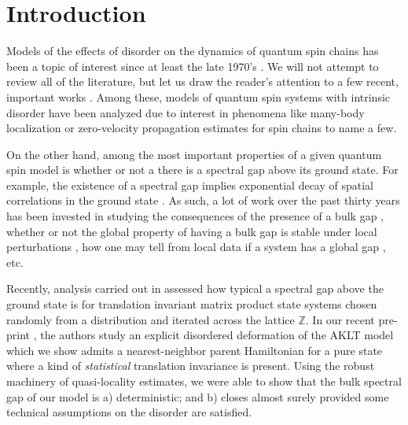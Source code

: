 \documentclass{article}
\newcommand{\Z}{\mathbb Z}
\newcommand{\<}{\langle}
\renewcommand{\>}{\rangle}
\theoremstyle{definition}
\numberwithin{equation}{section}
\begin{document}
\section{Introduction}
Models of the effects of disorder on the dynamics of quantum spin chains has been a topic of interest since at least the late 1970's \cite{Pastur, PasturFigotin}. We will not attempt to review all of the literature, but let us draw the reader's attention to a few recent, important works  \cite{Abdul-Rahman_et_al, AizenmannWarzel, Anderson,  Baldwin, ElgartKlein24_2, ElgartKlein24_1, ElgartKlein25,  Stolz_ALoc, Stolz_MBL}. Among these, models of quantum spin systems with intrinsic disorder have been analyzed due to interest in phenomena like many-body localization or zero-velocity propagation estimates for spin chains \cite{ElgartKlein25, Imbrie, NachtergaeleReschke, Stolz_MBL} to name a few. 

On the other hand, among the most important properties of a given quantum spin model is whether or not a there is a spectral gap above its ground state. For example, the existence of a spectral gap implies exponential decay of spatial correlations in the ground state \cite{HastingsKoma, NachtergaeleSims}. As such, a lot of work over the past thirty years has been invested in studying the consequences of the presence of a bulk gap \cite{NachtergaeleSims}, whether or not the global property of having a bulk gap is stable under local perturbations \cite{BravyiHastingsMichalakis, MichalakisZwolak, NachtergaeleSimsYoung, NachtergaeleSimsYoung_2, NachtergaeleSimsYoung_bulk}, how one may tell from local data if a system has a global gap \cite{Knabe, Lemm_ATMP, Nachteragele}, etc. 

Recently, analysis carried out in \cite{JauslinLemm, LancienPerezGarcia} assessed how typical a spectral gap above the ground state is for translation invariant matrix product state systems chosen randomly from a distribution and iterated across the lattice $\Z$. In our recent pre-print \cite{RoonSchenker}, the authors study an explicit disordered deformation of the AKLT model \cite{AKLT, FannesNachtergaeleWerner} which we show admits a nearest-neighbor parent Hamiltonian for a pure state where a kind of \emph{statistical} translation invariance is present. Using the robust machinery of quasi-locality estimates, we were able to show that the bulk spectral gap of our model is a) deterministic; and b) closes almost surely provided some technical assumptions on the disorder are satisfied. 
\end{document}
